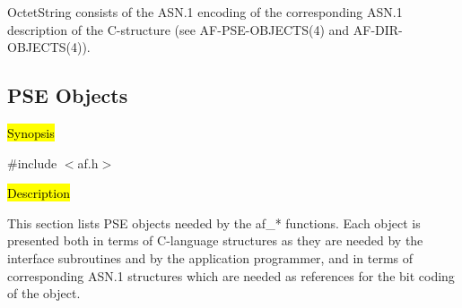 OctetString consists of the ASN.1 encoding of the corresponding ASN.1 description of the C-structure
(see AF-PSE-OBJECTS(4) and AF-DIR-OBJECTS(4)).

\subsection{PSE Objects}
\label{af-sw-cc}

\hl{Synopsis}

\#include $<$af.h$>$

\hl{Description}
     
This section lists PSE objects needed by the af\_* functions. 
Each object is presented both in terms
of C-language structures as they are needed by the interface subroutines and
by the application programmer, and in terms of corresponding ASN.1 structures
which are needed as references for the bit coding of the object.
 

